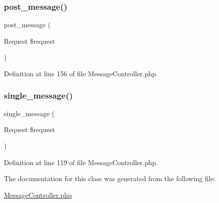 \subsubsection{\texorpdfstring{post\_message()}{post\_message()}}
{\footnotesize\ttfamily post\+\_\+message (\begin{DoxyParamCaption}\item[{Request}]{\$request }\end{DoxyParamCaption})}



Definition at line 156 of file Message\+Controller.\+php.

\mbox{\label{class_responsive_1_1_http_1_1_controllers_1_1_message_controller_a0b71550e8a40e4000d861d490ff61fe1}} 
\subsubsection{\texorpdfstring{single\_message()}{single\_message()}}
{\footnotesize\ttfamily single\+\_\+message (\begin{DoxyParamCaption}\item[{Request}]{\$request }\end{DoxyParamCaption})}



Definition at line 119 of file Message\+Controller.\+php.



The documentation for this class was generated from the following file\+:\begin{DoxyCompactItemize}
\item 
\mbox{\hyperlink{_message_controller_8php}{Message\+Controller.\+php}}\end{DoxyCompactItemize}
